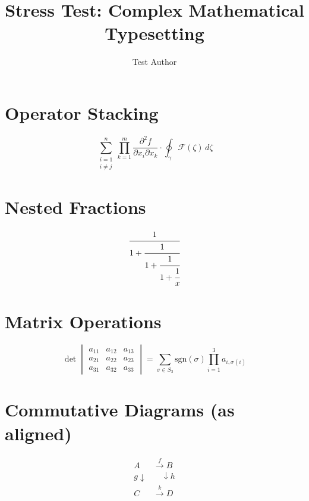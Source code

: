 \documentclass{article}
\begin{document}
\title{Stress Test: Complex Mathematical Typesetting}
\author{Test Author}
\maketitle

\section{Operator Stacking}

\begin{equation}
    \sum_{\substack{i=1 \\ i \neq j}}^{n} \prod_{k=1}^{m}
    \frac{\partial^2 f}{\partial x_i \partial x_k} \cdot
    \oint_{\gamma} \mathscr{F}(\zeta) \, d\zeta
\end{equation}

\section{Nested Fractions}

\begin{equation}
    \cfrac{1}{1 + \cfrac{1}{1 + \cfrac{1}{1 + \cfrac{1}{x}}}}
\end{equation}

\section{Matrix Operations}

\begin{equation}
    \det \begin{vmatrix}
        a_{11} & a_{12} & a_{13} \\
        a_{21} & a_{22} & a_{23} \\
        a_{31} & a_{32} & a_{33}
    \end{vmatrix} =
    \sum_{\sigma \in S_3} \text{sgn}(\sigma)
    \prod_{i=1}^{3} a_{i,\sigma(i)}
\end{equation}

\section{Commutative Diagrams (as aligned)}

\begin{equation}
    \begin{aligned}
        A &\xrightarrow{f} B \\
        {\scriptstyle g}\downarrow &\quad \downarrow{\scriptstyle h} \\
        C &\xrightarrow{k} D
    \end{aligned}
\end{equation}
\end{document}
